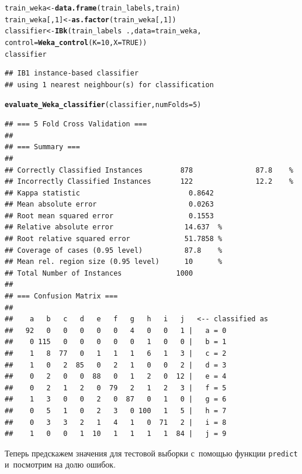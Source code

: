 \documentclass[final,pdftex]{../../template/epsilonj}\usepackage[]{graphicx}\usepackage[]{color}
\makeatletter
\newcommand{\hlnum}[1]{\textcolor[rgb]{0.686,0.059,0.569}{#1}}%
\newcommand{\hlopt}[1]{\textcolor[rgb]{0,0,0}{#1}}%
\newcommand{\hlstd}[1]{\textcolor[rgb]{0.345,0.345,0.345}{#1}}%
\newcommand{\hlkwb}[1]{\textcolor[rgb]{0.69,0.353,0.396}{#1}}%
\newcommand{\hlkwc}[1]{\textcolor[rgb]{0.333,0.667,0.333}{#1}}%
\newcommand{\hlkwd}[1]{\textcolor[rgb]{0.737,0.353,0.396}{\textbf{#1}}}%
\newenvironment{kframe}{%
 \def\at@end@of@kframe{}%
 \ifinner\ifhmode%
  \def\at@end@of@kframe{\end{minipage}}%
  \begin{minipage}{\columnwidth}%
 \fi\fi%
 \def\FrameCommand##1{\hskip\@totalleftmargin \hskip-\fboxsep
 \colorbox{shadecolor}{##1}\hskip-\fboxsep
     \hskip-\linewidth \hskip-\@totalleftmargin \hskip\columnwidth}%
 \MakeFramed {\advance\hsize-\width
   \@totalleftmargin\z@ \linewidth\hsize
   \@setminipage}}%
 {\par\unskip\endMakeFramed%
 \at@end@of@kframe}
\newenvironment{knitrout}{}{} %
\makeatother
\begin{document}
\begin{knitrout}
\begin{kframe}
\begin{alltt}
\hlstd{train_weka} \hlkwb{<-} \hlkwd{data.frame}\hlstd{(train_labels, train)}
\hlstd{train_weka[,}\hlnum{1}\hlstd{]} \hlkwb{<-} \hlkwd{as.factor}\hlstd{(train_weka[,}\hlnum{1}\hlstd{])}
\hlstd{classifier} \hlkwb{<-} \hlkwd{IBk}\hlstd{(train_labels}\hlopt{~}\hlstd{.,} \hlkwc{data} \hlstd{= train_weka,}
                  \hlkwc{control} \hlstd{=} \hlkwd{Weka_control}\hlstd{(}\hlkwc{K} \hlstd{=} \hlnum{10}\hlstd{,} \hlkwc{X}\hlstd{=}\hlnum{TRUE}\hlstd{))}
\hlstd{classifier}
\end{alltt}
\begin{verbatim}
## IB1 instance-based classifier
## using 1 nearest neighbour(s) for classification
\end{verbatim}
\begin{alltt}
\hlkwd{evaluate_Weka_classifier}\hlstd{(classifier,} \hlkwc{numFolds} \hlstd{=} \hlnum{5}\hlstd{)}
\end{alltt}
\begin{verbatim}
## === 5 Fold Cross Validation ===
## 
## === Summary ===
## 
## Correctly Classified Instances         878               87.8    %
## Incorrectly Classified Instances       122               12.2    %
## Kappa statistic                          0.8642
## Mean absolute error                      0.0263
## Root mean squared error                  0.1553
## Relative absolute error                 14.637  %
## Root relative squared error             51.7858 %
## Coverage of cases (0.95 level)          87.8    %
## Mean rel. region size (0.95 level)      10      %
## Total Number of Instances             1000     
## 
## === Confusion Matrix ===
## 
##    a   b   c   d   e   f   g   h   i   j   <-- classified as
##   92   0   0   0   0   0   4   0   0   1 |   a = 0
##    0 115   0   0   0   0   0   1   0   0 |   b = 1
##    1   8  77   0   1   1   1   6   1   3 |   c = 2
##    1   0   2  85   0   2   1   0   0   2 |   d = 3
##    0   2   0   0  88   0   1   2   0  12 |   e = 4
##    0   2   1   2   0  79   2   1   2   3 |   f = 5
##    1   3   0   0   2   0  87   0   1   0 |   g = 6
##    0   5   1   0   2   3   0 100   1   5 |   h = 7
##    0   3   3   2   1   4   1   0  71   2 |   i = 8
##    1   0   0   1  10   1   1   1   1  84 |   j = 9
\end{verbatim}
\end{kframe}
\end{knitrout}

Теперь предскажем значения для тестовой выборки с~помощью функции \texttt{predict} и~посмотрим на долю ошибок.
\end{document}
